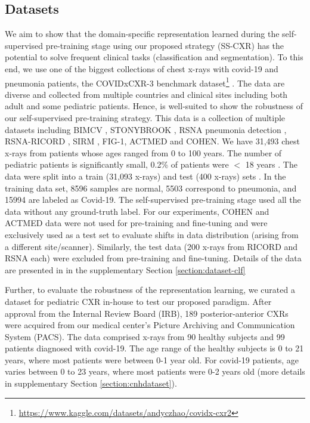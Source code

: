 \documentclass[10pt,journal,compsoc]{IEEEtran}
\begin{document}
\subsection{Datasets}
We aim to show that the domain-specific representation learned during the self-supervised pre-training stage using our proposed strategy (SS-CXR) has the potential to solve frequent clinical tasks (classification and segmentation). To this end, we use one of the biggest collections of chest x-rays with covid-19 and pneumonia patients, the COVIDxCXR-3 benchmark dataset\footnote{\url{https://www.kaggle.com/datasets/andyczhao/covidx-cxr2}} \cite{Covidnet, pavlova2022covidx}. The data are diverse and collected from multiple countries and clinical sites including both adult and some pediatric patients. Hence, is well-suited to show the robustness of our self-supervised pre-training strategy.   
This data is a collection of multiple datasets including BIMCV \cite{bimcv}, STONYBROOK \cite{stony}, RSNA pneumonia detection \cite{rsna}, RSNA-RICORD \cite{ricord}, SIRM \cite{SIRM}, FIG-1\cite{fig1}, ACTMED \cite{actmed} and COHEN\cite{cohen}. We have 31,493 chest x-rays from patients whose ages ranged from 0 to 100 years. The number of pediatric patients is significantly small, 0.2\% of patients were $<$ 18 years \cite{pavlova2022covidx}. The data were split into a train (31,093 x-rays) and test (400 x-rays) sets . In the training data set, 8596 samples are normal, 5503 correspond to pneumonia, and 15994 are labeled as Covid-19. The self-supervised pre-training stage used all the data without any ground-truth label.  For our experiments, COHEN and ACTMED data were not used for pre-training and fine-tuning and were exclusively used as a test set to evaluate shifts in data distribution (arising from a different site/scanner). Similarly, the test data (200 x-rays from RICORD and RSNA each) were excluded from pre-training and fine-tuning. Details of the data are presented in in the supplementary Section \ref{section:dataset-clf} 

Further, to evaluate the robustness of the representation learning, we curated a dataset for pediatric CXR in-house to test our proposed paradigm. After approval from the Internal Review Board (IRB), 189 posterior-anterior CXRs were acquired from our medical center's Picture Archiving and Communication System (PACS). The data comprised x-rays from 90 healthy subjects and 99 patients diagnosed with covid-19. The age range of the healthy subjects is 0 to 21 years, where most patients were between 0-1 year old. For covid-19 patients, age varies between 0 to 23 years, where most patients were 0-2 years old (more details in supplementary Section \ref{section:cnhdataset}).
\end{document}
